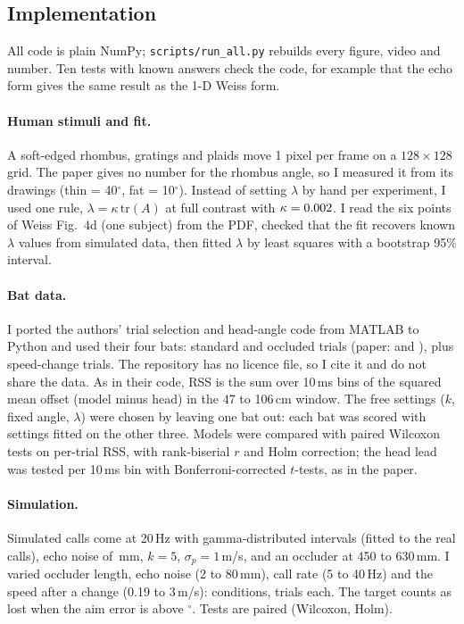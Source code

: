 \documentclass[10pt,twocolumn]{article}
\begin{document}
\subsection{Implementation}
All code is plain NumPy; \texttt{scripts/run\_all.py} rebuilds every figure, video and number. Ten tests with known answers check the code, for example that the echo form gives the same result as the 1-D Weiss form.

\paragraph{Human stimuli and fit.} A soft-edged rhombus, gratings and plaids move 1 pixel per frame on a $128\times128$ grid. The paper gives no number for the rhombus angle, so I measured it from its drawings (thin = 40$^\circ$, fat = 10$^\circ$). Instead of setting $\lambda$ by hand per experiment, I used one rule, $\lambda=\kappa\,\mathrm{tr}(A)$ at full contrast with $\kappa=0.002$. I read the six points of Weiss Fig.~4d (one subject) from the PDF, checked that the fit recovers known $\lambda$ values from simulated data, then fitted $\lambda$ by least squares with a bootstrap 95\% interval.

\paragraph{Bat data.} I ported the authors' trial selection and head-angle code from MATLAB \cite{sallesrepo} to Python and used their four bats: \realNBL{} standard and \realNOL{} occluded trials (paper: \paperNBL{} and \paperNOL), plus speed-change trials. The repository has no licence file, so I cite it and do not share the data. As in their code, RSS is the sum over 10\,ms bins of the squared mean offset (model minus head) in the 47 to 106\,cm window. The free settings ($k$, fixed angle, $\lambda$) were chosen by leaving one bat out: each bat was scored with settings fitted on the other three. Models were compared with paired Wilcoxon tests on per-trial RSS, with rank-biserial $r$ and Holm correction; the head lead was tested per 10\,ms bin with Bonferroni-corrected $t$-tests, as in the paper.

\paragraph{Simulation.} Simulated calls come at 20\,Hz with gamma-distributed intervals (fitted to the real calls), echo noise of \simBaseNoiseMm\,mm, $k=5$, $\sigma_p=1$\,m/s, and an occluder at 450 to 630\,mm. I varied occluder length, echo noise (2 to 80\,mm), call rate (5 to 40\,Hz) and the speed after a change (0.19 to 3\,m/s): \simNCells{} conditions, \simNTrialsPerCell{} trials each. The target counts as lost when the aim error is above \simTolDeg$^\circ$. Tests are paired (Wilcoxon, Holm).
\end{document}
